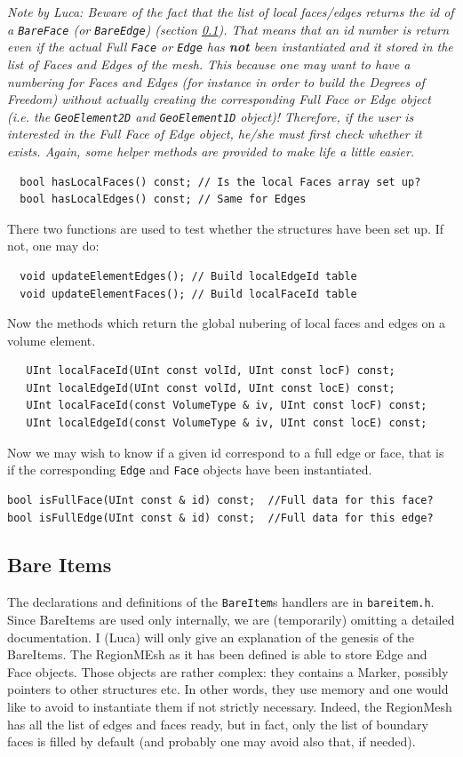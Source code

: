   \textsl{Note by Luca: Beware of the fact that the list of local
  faces/edges returns the id of a \texttt{BareFace} (or
  \texttt{BareEdge}) (section \ref{sec:bareentities}). That means that
  an id number is return even if the actual Full \texttt{Face} or
  \texttt{Edge} has \textbf{not} been instantiated and it stored in the
  list of Faces and Edges of the mesh.  This because one may want to
  have a numbering for Faces and Edges (for instance in order to build
  the Degrees of Freedom) without actually creating the corresponding
Full Face or Edge object (i.e. the \texttt{GeoElement2D} and
\texttt{GeoElement1D} object)! Therefore, if the user is interested in
the Full Face of Edge object, he/she must first check whether it exists.
Again, some helper methods are provided to make life a little easier.}

\begin{verbatim}
  bool hasLocalFaces() const; // Is the local Faces array set up?
  bool hasLocalEdges() const; // Same for Edges
\end{verbatim}
There two functions are used to test whether the structures have been set 
up. If not, one may do:
\begin{verbatim}
  void updateElementEdges(); // Build localEdgeId table
  void updateElementFaces(); // Build localFaceId table
\end{verbatim}
Now the methods which return the global nubering of
local faces and edges on a volume element.
\begin{verbatim}
   UInt localFaceId(UInt const volId, UInt const locF) const;
   UInt localEdgeId(UInt const volId, UInt const locE) const;
   UInt localFaceId(const VolumeType & iv, UInt const locF) const;
   UInt localEdgeId(const VolumeType & iv, UInt const locE) const;
\end{verbatim}
Now we may wish to know if a given id correspond to a full edge or
face, that is if the corresponding \texttt{Edge} and \texttt{Face}
objects have been instantiated. 

\begin{verbatim}
bool isFullFace(UInt const & id) const;  //Full data for this face?
bool isFullEdge(UInt const & id) const;  //Full data for this edge?
\end{verbatim}
\subsection{Bare Items}\label{sec:bareentities}
The declarations and definitions of the \texttt{BareItem}s handlers are in
\texttt{bareitem.h}. Since BareItems are used only internally, we are
(temporarily) omitting a detailed documentation. I (Luca) will only
give an explanation of the genesis of the BareItems. The RegionMEsh as
it has been defined is able to store Edge and Face objects. Those
objects are rather complex: they contains a Marker, possibly pointers
to other structures etc. In other words, they use memory and one would
like to avoid to instantiate them if not strictly necessary. Indeed,
the RegionMesh has all the list of edges and faces ready, but in fact,
only the list of boundary faces is filled by default (and probably one
may avoid also that, if needed). 


